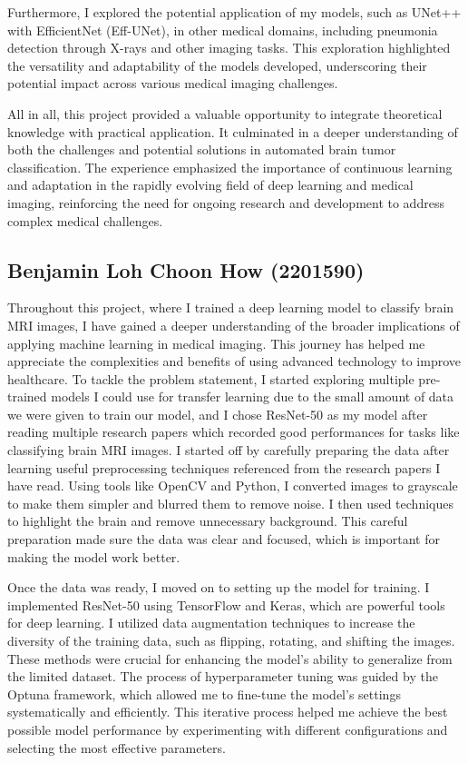 Furthermore, I explored the potential application of my models, such as UNet++ with EfficientNet (Eff-UNet), in other medical domains, including pneumonia detection through X-rays and other imaging tasks. This exploration highlighted the versatility and adaptability of the models developed, underscoring their potential impact across various medical imaging challenges.

All in all, this project provided a valuable opportunity to integrate theoretical knowledge with practical application. It culminated in a deeper understanding of both the challenges and potential solutions in automated brain tumor classification. The experience emphasized the importance of continuous learning and adaptation in the rapidly evolving field of deep learning and medical imaging, reinforcing the need for ongoing research and development to address complex medical challenges.

\subsection{Benjamin Loh Choon How (2201590)}

Throughout this project, where I trained a deep learning model to classify brain MRI images, I have gained a deeper understanding of the broader implications of applying machine learning in medical imaging. This journey has helped me appreciate the complexities and benefits of using advanced technology to improve healthcare. To tackle the problem statement, I started exploring multiple pre-trained models I could use for transfer learning due to the small amount of data we were given to train our model, and I chose ResNet-50 as my model after reading multiple research papers which recorded good performances for tasks like classifying brain MRI images. I started off by carefully preparing the data after learning useful preprocessing techniques referenced from the research papers I have read. Using tools like OpenCV and Python, I converted images to grayscale to make them simpler and blurred them to remove noise. I then used techniques to highlight the brain and remove unnecessary background. This careful preparation made sure the data was clear and focused, which is important for making the model work better.

Once the data was ready, I moved on to setting up the model for training. I implemented ResNet-50 using TensorFlow and Keras, which are powerful tools for deep learning. I utilized data augmentation techniques to increase the diversity of the training data, such as flipping, rotating, and shifting the images. These methods were crucial for enhancing the model’s ability to generalize from the limited dataset. The process of hyperparameter tuning was guided by the Optuna framework, which allowed me to fine-tune the model's settings systematically and efficiently. This iterative process helped me achieve the best possible model performance by experimenting with different configurations and selecting the most effective parameters.

